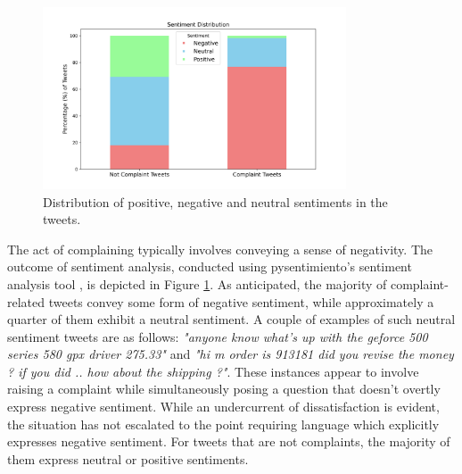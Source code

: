 \begin{figure}[htb]
    \centering
    \includegraphics[width=9cm]{figures/sentiment.png}
    \vspace*{-3mm}
    \caption{Distribution of positive, negative and neutral sentiments in the tweets.}
    \label{fig: sentiment}
\end{figure}

The act of complaining typically involves conveying a sense of negativity. The outcome of sentiment analysis, conducted using pysentimiento's sentiment analysis tool \cite{perezPysentimientoPythonToolkit2021}, is depicted in Figure \ref{fig: sentiment}. As anticipated, the majority of complaint-related tweets convey some form of negative sentiment, while approximately a quarter of them exhibit a neutral sentiment. A couple of examples of such neutral sentiment tweets are as follows: \textit{"anyone know what's up with the geforce 500 series 580 gpx driver 275.33"} and \textit{"hi m order is 913181 did you revise the money ? if you did .. how about the shipping ?"}. These instances appear to involve raising a complaint while simultaneously posing a question that doesn't overtly express negative sentiment. While an undercurrent of dissatisfaction is evident, the situation has not escalated to the point requiring language which explicitly expresses negative sentiment. For tweets that are not complaints, the majority of them express neutral or positive sentiments.

